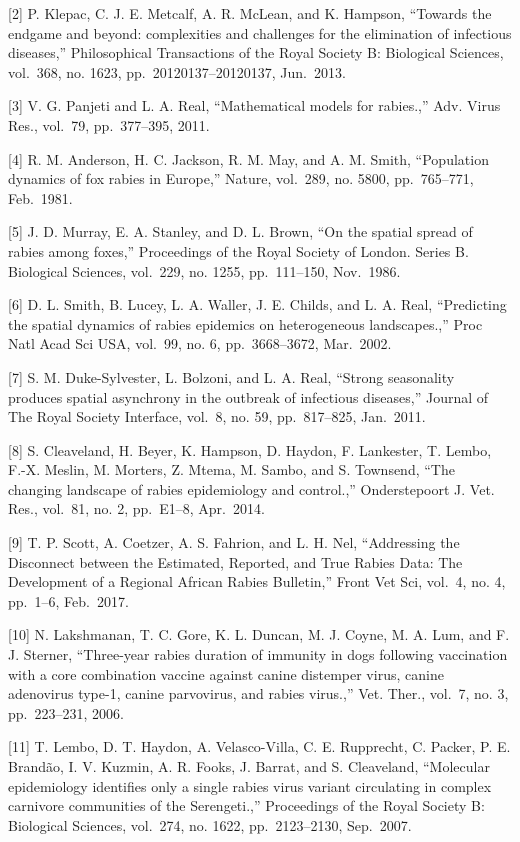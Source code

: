 \documentclass[
]{book}
\begin{document}
{[}2{]} P. Klepac, C. J. E. Metcalf, A. R. McLean, and K. Hampson, ``Towards the endgame and beyond: complexities and challenges for the elimination of infectious diseases,'' Philosophical Transactions of the Royal Society B: Biological Sciences, vol.~368, no. 1623, pp.~20120137--20120137, Jun.~2013.

{[}3{]} V. G. Panjeti and L. A. Real, ``Mathematical models for rabies.,'' Adv. Virus Res., vol.~79, pp.~377--395, 2011.

{[}4{]} R. M. Anderson, H. C. Jackson, R. M. May, and A. M. Smith, ``Population dynamics of fox rabies in Europe,'' Nature, vol.~289, no. 5800, pp.~765--771, Feb.~1981.

{[}5{]} J. D. Murray, E. A. Stanley, and D. L. Brown, ``On the spatial spread of rabies among foxes,'' Proceedings of the Royal Society of London. Series B. Biological Sciences, vol.~229, no. 1255, pp.~111--150, Nov.~1986.

{[}6{]} D. L. Smith, B. Lucey, L. A. Waller, J. E. Childs, and L. A. Real, ``Predicting the spatial dynamics of rabies epidemics on heterogeneous landscapes.,'' Proc Natl Acad Sci USA, vol.~99, no. 6, pp.~3668--3672, Mar.~2002.

{[}7{]} S. M. Duke-Sylvester, L. Bolzoni, and L. A. Real, ``Strong seasonality produces spatial asynchrony in the outbreak of infectious diseases,'' Journal of The Royal Society Interface, vol.~8, no. 59, pp.~817--825, Jan.~2011.

{[}8{]} S. Cleaveland, H. Beyer, K. Hampson, D. Haydon, F. Lankester, T. Lembo, F.-X. Meslin, M. Morters, Z. Mtema, M. Sambo, and S. Townsend, ``The changing landscape of rabies epidemiology and control.,'' Onderstepoort J. Vet. Res., vol.~81, no. 2, pp.~E1--8, Apr.~2014.

{[}9{]} T. P. Scott, A. Coetzer, A. S. Fahrion, and L. H. Nel, ``Addressing the Disconnect between the Estimated, Reported, and True Rabies Data: The Development of a Regional African Rabies Bulletin,'' Front Vet Sci, vol.~4, no. 4, pp.~1--6, Feb.~2017.

{[}10{]} N. Lakshmanan, T. C. Gore, K. L. Duncan, M. J. Coyne, M. A. Lum, and F. J. Sterner, ``Three-year rabies duration of immunity in dogs following vaccination with a core combination vaccine against canine distemper virus, canine adenovirus type-1, canine parvovirus, and rabies virus.,'' Vet. Ther., vol.~7, no. 3, pp.~223--231, 2006.

{[}11{]} T. Lembo, D. T. Haydon, A. Velasco-Villa, C. E. Rupprecht, C. Packer, P. E. Brandão, I. V. Kuzmin, A. R. Fooks, J. Barrat, and S. Cleaveland, ``Molecular epidemiology identifies only a single rabies virus variant circulating in complex carnivore communities of the Serengeti.,'' Proceedings of the Royal Society B: Biological Sciences, vol.~274, no. 1622, pp.~2123--2130, Sep.~2007.
\end{document}
